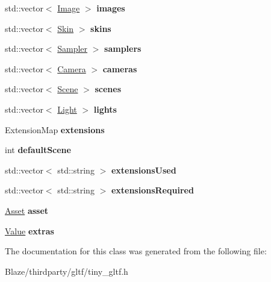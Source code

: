 \begin{DoxyCompactItemize}
std\+::vector$<$ \hyperlink{structtinygltf_1_1Image}{Image} $>$ {\bfseries images}
\item 
\mbox{\label{classtinygltf_1_1Model_a723ae466a207f49095665897fcfe2abf}} 
std\+::vector$<$ \hyperlink{structtinygltf_1_1Skin}{Skin} $>$ {\bfseries skins}
\item 
\mbox{\label{classtinygltf_1_1Model_a45e47a9356038e3e990c7be5c45ecebd}} 
std\+::vector$<$ \hyperlink{structtinygltf_1_1Sampler}{Sampler} $>$ {\bfseries samplers}
\item 
\mbox{\label{classtinygltf_1_1Model_a3e882ea46bdefc1ed76a5d485c7991ae}} 
std\+::vector$<$ \hyperlink{structtinygltf_1_1Camera}{Camera} $>$ {\bfseries cameras}
\item 
\mbox{\label{classtinygltf_1_1Model_a76ec837a26e8c32e3036fdc408f1f643}} 
std\+::vector$<$ \hyperlink{structtinygltf_1_1Scene}{Scene} $>$ {\bfseries scenes}
\item 
\mbox{\label{classtinygltf_1_1Model_ae5cee8f6437e1500d963d9a93d13aeb0}} 
std\+::vector$<$ \hyperlink{structtinygltf_1_1Light}{Light} $>$ {\bfseries lights}
\item 
\mbox{\label{classtinygltf_1_1Model_a657686ee8eb8d668d1fb80715c3616c6}} 
Extension\+Map {\bfseries extensions}
\item 
\mbox{\label{classtinygltf_1_1Model_a473ddd845ed4879296532bac803fe001}} 
int {\bfseries default\+Scene}
\item 
\mbox{\label{classtinygltf_1_1Model_af0eb638455c9331ce977b0a32c5261ad}} 
std\+::vector$<$ std\+::string $>$ {\bfseries extensions\+Used}
\item 
\mbox{\label{classtinygltf_1_1Model_ac4ebd72b59f83f8fdff31421e5c2a410}} 
std\+::vector$<$ std\+::string $>$ {\bfseries extensions\+Required}
\item 
\mbox{\label{classtinygltf_1_1Model_a0f9d99790420170af35650b5597ac740}} 
\hyperlink{structtinygltf_1_1Asset}{Asset} {\bfseries asset}
\item 
\mbox{\label{classtinygltf_1_1Model_a1128cef9196f631896b495b3e1a341b6}} 
\hyperlink{classtinygltf_1_1Value}{Value} {\bfseries extras}
\end{DoxyCompactItemize}


The documentation for this class was generated from the following file\+:\begin{DoxyCompactItemize}
\item 
Blaze/thirdparty/gltf/tiny\+\_\+gltf.\+h\end{DoxyCompactItemize}
